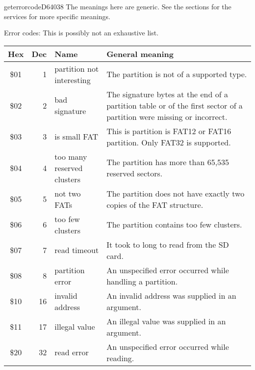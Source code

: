 \begin{hyppotrap}{geterrorcode}{D640}{38}
  The meanings here are generic. See the sections for the services for more
  specific meanings.
\item [Error codes:] This is possibly not an exhaustive list.
{
  \begin{longtable}{|c|r|l|p{8cm}|}
    \hline
    \textbf{Hex} & \textbf{Dec} & \textbf{Name} & \textbf{General meaning}\\
    \hline
    \endhead
    \index{HYPPO Error Codes!\$01}
    \$01 & 1 & \makecell[tl]{partition not \\ interesting} &
    The partition is not of a supported type.
    \\\hline
    \index{HYPPO Error Codes!\$02}
    \$02 & 2 & bad signature &
    The signature bytes at the end of a partition table or of the first sector
    of a partition were missing or incorrect.
    \\\hline
    \index{HYPPO Error Codes!\$03}
    \$03 & 3 & is small FAT &
    This is partition is FAT12 or FAT16 partition. Only FAT32 is supported.
    \\\hline
    \index{HYPPO Error Codes!\$04}
    \$04 & 4 & \makecell[tl]{too many reserved\\clusters} &
    The partition has more than 65,535 reserved sectors.
    \\\hline
    \index{HYPPO Error Codes!\$05}
    \$05 & 5 & not two FATs &
    The partition does not have exactly two copies of the FAT structure.
    \\\hline
    \index{HYPPO Error Codes!\$06}
    \$06 & 6 & too few clusters &
    The partition contains too few clusters.
    \\\hline
    \index{HYPPO Error Codes!\$07}
    \$07 & 7 & read timeout &
    It took to long to read from the SD card.
    \\\hline
    \index{HYPPO Error Codes!\$08}
    \$08 & 8 & partition error &
    An unspecified error occurred while handling a partition.
    \\\hline
    \index{HYPPO Error Codes!\$10}
    \$10 & 16 & invalid address &
    An invalid address was supplied in an argument.
    \\\hline
    \index{HYPPO Error Codes!\$11}
    \$11 & 17 & illegal value &
    An illegal value was supplied in an argument.
    \\\hline
    \index{HYPPO Error Codes!\$20}
    \$20 & 32 & read error &
    An unspecified error occurred while reading.

\end{longtable}}
\end{hyppotrap}
